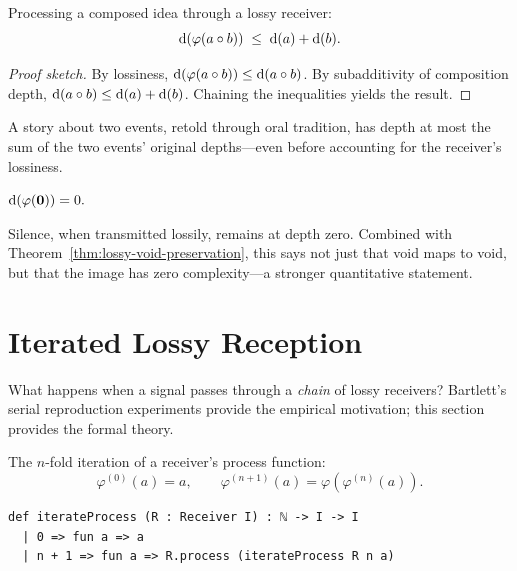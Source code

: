 \begin{theorem}
\label{thm:lossy-compose-bound}
Processing a composed idea through a lossy receiver:
\[
  \operatorname{d}(\varphi(a\circ b)) \;\le\; \operatorname{d}(a) + \operatorname{d}(b).
\]
\end{theorem}

\begin{proof}[Proof sketch]
By lossiness, $\operatorname{d}(\varphi(a\circ b))\le\operatorname{d}(a\circ b)$.  By
subadditivity of composition depth, $\operatorname{d}(a\circ b)\le\operatorname{d}(a)+\operatorname{d}(b)$.
Chaining the inequalities yields the result.
\end{proof}

A story about two events, retold through oral tradition, has depth at most
the sum of the two events' original depths---even before accounting for the
receiver's lossiness.

\begin{theorem}
\label{thm:lossy-void-depth}
$\operatorname{d}(\varphi(\mathbf{0})) = 0.$
\end{theorem}

Silence, when transmitted lossily, remains at depth zero.  Combined with
Theorem~\ref{thm:lossy-void-preservation}, this says not just that void
maps to void, but that the image has zero complexity---a stronger
quantitative statement.


\section{Iterated Lossy Reception}
\label{sec:lossy-iterated}

What happens when a signal passes through a \emph{chain} of lossy receivers?
Bartlett's serial reproduction experiments provide the empirical motivation;
this section provides the formal theory.

\begin{definition}
\label{def:iterate-process}
The $n$-fold iteration of a receiver's process function:
\[
  \varphi^{(0)}(a) = a, \qquad
  \varphi^{(n+1)}(a) = \varphi(\varphi^{(n)}(a)).
\]
\end{definition}

\begin{lstlisting}[caption={Iterated process in Lean~4.}]
def iterateProcess (R : Receiver I) : ℕ -> I -> I
  | 0 => fun a => a
  | n + 1 => fun a => R.process (iterateProcess R n a)
\end{lstlisting}

